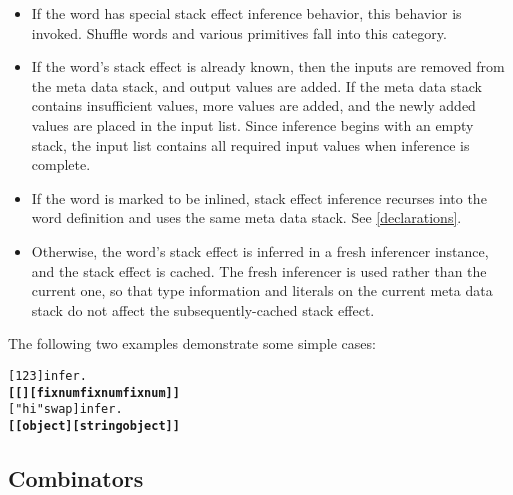 \documentclass{book}
\begin{document}
\begin{itemize}
\item If the word has special stack effect inference behavior, this behavior is invoked. Shuffle words and various primitives fall into this category.
\item If the word's stack effect is already known, then the inputs are removed from the meta data stack, and output values are added. If the meta data stack contains insufficient values, more values are added, and the newly added values are placed in the input list. Since inference begins with an empty stack, the input list contains all required input values when inference is complete.
\item If the word is marked to be inlined, stack effect inference recurses into the word definition and uses the same meta data stack. See \ref{declarations}.
\item Otherwise, the word's stack effect is inferred in a fresh inferencer instance, and the stack effect is cached. The fresh inferencer is used rather than the current one, so that type information and literals on the current meta data stack do not affect the subsequently-cached stack effect.
\end{itemize}

The following two examples demonstrate some simple cases:
\begin{alltt}
  [ 1 2 3 ] infer .
\textbf{[ [ ] [ fixnum fixnum fixnum ] ]}
  [ "hi" swap ] infer .
\textbf{[ [ object ] [ string object ] ]}
\end{alltt}

\subsection{Combinators}
\end{document}
